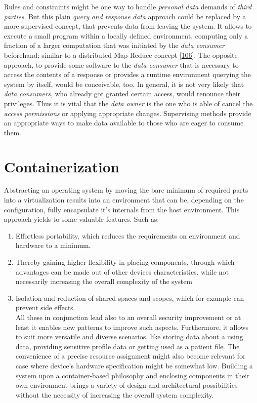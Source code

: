\documentclass[12pt,english,a4paper,titlepage,cleardoublepage=empty,dottedtoc]{report}
\providecommand{\tightlist}{%
  \setlength{\itemsep}{0pt}\setlength{\parskip}{0pt}}
\begin{document}
Rules and constraints might be one way to handle \emph{personal data}
demands of \emph{third parties}. But this plain \emph{query and response
data} approach could be replaced by a more supervised concept, that
prevents data from leaving the system. It allows to execute a small
program within a locally defined environment, computing only a fraction
of a larger computation that was initiated by the \emph{data consumer}
beforehand; similar to a distributed Map-Reduce concept
{[}\protect\hyperlink{ref-paper_2004_distributed-mapreduce}{106}{]}. The
opposite approach, to provide some software to the \emph{data consumer}
that is necessary to access the contents of a response or provides a
runtime environment querying the system by itself, would be conceivable,
too. In general, it is not very likely that \emph{data consumers}, who
already got granted certain access, would renounce their privileges.
Thus it is vital that the \emph{data owner} is the one who is able of
cancel the \emph{access permissions} or applying appropriate changes.
Supervising methods provide an appropriate ways to make data available
to those who are eager to consume them.

\section{Containerization}\label{containerization}

Abstracting an operating system by moving the bare minimum of required
parts into a virtualization results into an environment that can be,
depending on the configuration, fully encapsulate it's internals from
the host environment. This approach yields to some valuable features.
Such as:

\begin{enumerate}
\def\labelenumi{(\Alph{enumi})}
\tightlist
\item
  Effortless portability, which reduces the requirements on environment
  and hardware to a minimum.
\item
  Thereby gaining higher flexibility in placing components, through
  which advantages can be made out of other devices characteristics.
  while not necessarily increasing the overall complexity of the system
\item
  Isolation and reduction of shared spaces and scopes, which for example
  can prevent side effects.\\
  All these in conjunction lead also to an overall security improvement
  or at least it enables new patterns to improve such aspects.
  Furthermore, it allows to suit more versatile and diverse scenarios,
  like storing data about a using data, providing sensitive profile data
  or getting used as a patient file. The convenience of a precise
  resource assignment might also become relevant for case where device's
  hardware specification might be somewhat low. Building a system upon a
  container-based philosophy and enclosing components in their own
  environment brings a variety of design and architectural possibilities
  without the necessity of increasing the overall system complexity.
\end{enumerate}
\end{document}
